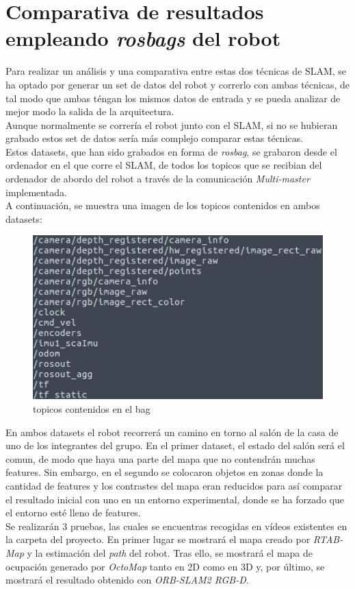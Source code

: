 \section{Comparativa de resultados empleando \textit{rosbags} del robot}
Para realizar un análisis y una comparativa entre estas dos técnicas de SLAM, se ha optado por generar un set de datos del robot y correrlo con ambas técnicas,
de tal modo que ambas téngan los mismos datos de entrada y se pueda analizar de mejor modo la salida de la arquitectura. \\
Aunque normalmente se correría el robot junto con el SLAM, si no se hubieran grabado estos set de datos sería más complejo comparar estas técnicas. \\
Estos datasets, que han sido grabados en forma de \textit{rosbag}, se grabaron desde el ordenador en el que corre el SLAM, de todos los topicos que se recibian
del ordenador de abordo del robot a través de la comunicación \textit{Multi-master} implementada.\\
A continuación, se muestra una imagen de los topicos contenidos en ambos datasets:
\begin{figure}[h!]
    \centering
    \includegraphics[width=.5\textwidth]{images/topics_bags}
    \caption{topicos contenidos en el bag}
\end{figure}

En ambos datasets el robot recorrerá un camino en torno al salón de la casa de uno de los integrantes del grupo. En el primer dataset, el estado del salón será 
el comun, de modo que haya una parte del mapa que no contendrán muchas features. Sin embargo, en el segundo se colocaron objetos en zonas donde la cantidad de features
y los contrastes del mapa eran reducidos para así comparar el resultado inicial con uno en un entorno experimental, donde se ha forzado que el entorno esté lleno de features.\\

Se realizarán 3 pruebas, las cuales se encuentras recogidas en vídeos existentes en la carpeta del proyecto. En primer lugar se mostrará el mapa creado por \textit{RTAB-Map} y
la estimación del \textit{path} del robot. Tras ello, se mostrará el mapa de ocupación generado por \textit{OctoMap} tanto en 2D como en 3D y, por último, se mostrará el
resultado obtenido con \textit{ORB-SLAM2 RGB-D}. \\

